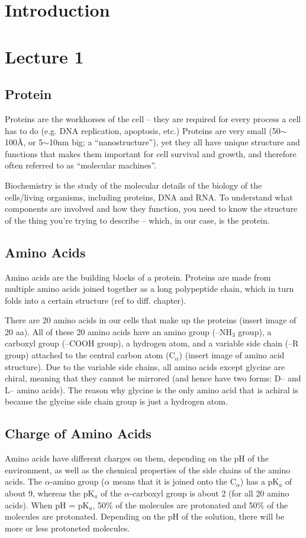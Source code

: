 \documentclass[a4paper, 12pt]{report}
\newcommand{\mychapter}[2]{
    \setcounter{chapter}{#1}
    \setcounter{section}{0}
    \chapter*{#2}
    \addcontentsline{toc}{chapter}{#2}
}
\begin{document}


\tableofcontents
\newpage

\mychapter{0}{Introduction}

\mychapter{1}{Lecture 1}
\section{Protein}

Proteins are the workhorses of the cell -- they are required for every process a cell has to do (e.g. DNA replication, apoptosis, etc.)
Proteins are very small (50$\sim$100\AA{}, or 5$\sim$10nm big; a ``nanostructure''), yet they all have unique structure and functions that makes them important for cell survival and growth, and therefore often referred to as ``molecular machines''.

Biochemistry is the study of the molecular details of the biology of the cells/living organisms, including proteins, DNA and RNA.
To understand what components are involved and how they function, you need to know the structure of the thing you're trying to describe -- which, in our case, is the protein.

\section{Amino Acids}

Amino acids are the building blocks of a protein.
Proteins are made from multiple amino acids joined together as a long polypeptide chain, which in turn folds into a certain structure (ref to diff. chapter).

There are 20 amino acids in our cells that make up the proteins (insert image of 20 aa).
All of these 20 amino acids have an amino group (--NH$_3$ group), a carboxyl group (--COOH group), a hydrogen atom, and a variable side chain (--R group) attached to the central carbon atom (C$_{\alpha}$) (insert image of amino acid structure).
Due to the variable side chains, all amino acids except glycine are chiral, meaning that they cannot be mirrored (and hence have two forms: D-- and L-- amino acids).
The reason why glycine is the only amino acid that is achiral is because the glycine side chain group is just a hydrogen atom.

\section{Charge of Amino Acids}

Amino acids have different charges on them, depending on the pH of the environment, as well as the chemical properties of the side chains of the amino acids.
The $\alpha$-amino group ($\alpha$ means that it is joined onto the C$_{\alpha}$) has a pK$_a$ of about 9, whereas the pK$_a$ of the $\alpha$-carboxyl group is about 2 (for all 20 amino acids).
When pH = pK$_a$, 50\% of the molecules are protonated and 50\% of the molecules are protonated.
Depending on the pH of the solution, there will be more or less protoneted molecules.
\end{document}
